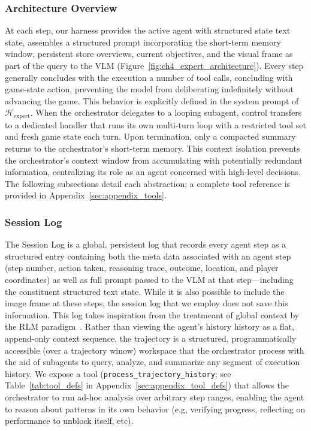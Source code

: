 \subsubsection{Architecture Overview}\label{sec:architecture_overview}


At each step, our harness provides the active agent with structured state text state, assembles a structured prompt incorporating the short-term memory window, persistent store overviews, current objectives, and the visual frame as part of the query to the VLM (Figure~\ref{fig:ch4_expert_architecture}). Every step generally concludes with the execution a number of tool calls, concluding with game-state action, preventing the model from deliberating indefinitely without advancing the game. This behavior is explicitly defined in the system prompt of $\mathcal{H}_{\text{expert}}$. When the orchestrator delegates to a looping subagent, control transfers to a dedicated handler that runs its own multi-turn loop with a restricted tool set and fresh game state each turn. Upon termination, only a compacted summary returns to the orchestrator's short-term memory. This context isolation prevents the orchestrator's context window from accumulating with potentially redundant information, centralizing its role as an agent concerned with high-level decisions. The following subsections detail each abstraction; a complete tool reference is provided in Appendix~\ref{sec:appendix_tools}.

\subsubsection{Session Log}\label{sec:trajectory_window}

The Session Log is a global, persistent log that records every agent step as a structured entry containing both the meta data associated with an agent step (step number, action taken, reasoning trace, outcome, location, and player coordinates) as well as full prompt passed to the VLM at that step---including the constituent structured text state. While it is also possible to include the image frame at these steps, the session log that we employ does not save this information. This log takes inspiration from the treatmeant of global context by the RLM paradigm~\citep{qu2024recursive}. Rather than viewing the agent's history history as a flat, append-only context sequence, the trajectory is a structured, programmatically accessible (over a trajectory winow) workspace that the orchestrator process with the aid of subagents to query, analyze, and summarize any segment of execution history. We expose a tool (\texttt{process\_trajectory\_history}; see Table~\ref{tab:tool_defs} in Appendix~\ref{sec:appendix_tool_defs}) that allows the orchestrator to run ad-hoc analysis over arbitrary step ranges, enabling the agent to reason about patterns in its own behavior (e.g, verifying progress, reflecting on performance to unblock itself, etc).

